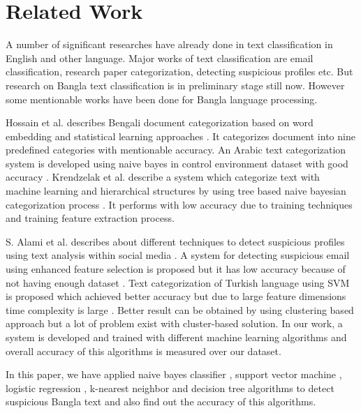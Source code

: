 \section{\textbf{Related Work}}
A number of significant researches have already done in text classification in English and other language. Major works of text classification are email classification, research paper categorization, detecting suspicious profiles etc.
But research on Bangla text classification is in preliminary stage still now. However some mentionable works have been done for Bangla language processing.
\vspace{0.1cm}

Hossain et al. describes Bengali document categorization based on word embedding and statistical learning approaches \cite{hossain2018automatic}. It categorizes document into nine predefined categories with mentionable accuracy. An Arabic text categorization system is developed using naive bayes in control environment dataset with good accuracy \cite{alsaleem2011automated}.
Krendzelak et al. describe a system which categorize text with machine learning and hierarchical structures by using tree based naive bayesian categorization process \cite{krendzelak2015text, chy2014bangla}. It performs with low accuracy due to training techniques and training feature extraction process.
\vspace{0.1cm}

S. Alami et al. describes about different techniques to detect suspicious profiles using text analysis within social media \cite{alami2015detecting}. A system for detecting suspicious email using enhanced feature selection is proposed but it has low accuracy because of not having enough dataset \cite{nizamani2013modeling}. Text categorization of Turkish language using SVM is proposed which achieved better accuracy but due to large feature dimensions time complexity is large \cite{kaya2012sentiment}. Better result can be obtained by using clustering based approach \cite{ismail2014bangla, ahmad2016bengali} but a lot of problem exist with cluster-based solution. In our work, a system is developed and trained with different machine learning algorithms and overall accuracy of this algorithms is measured over our dataset.\par
In this paper, we have applied naive bayes classifier \cite{yoo2015classification}, support vector machine \cite{wei2012text,villmann2017can}, logistic regression \cite{sharma2015active}, k-nearest neighbor \cite{harisinghaney2014text} and decision tree \cite{chavan2014survey} algorithms to detect suspicious Bangla text and also find out the accuracy of this algorithms.